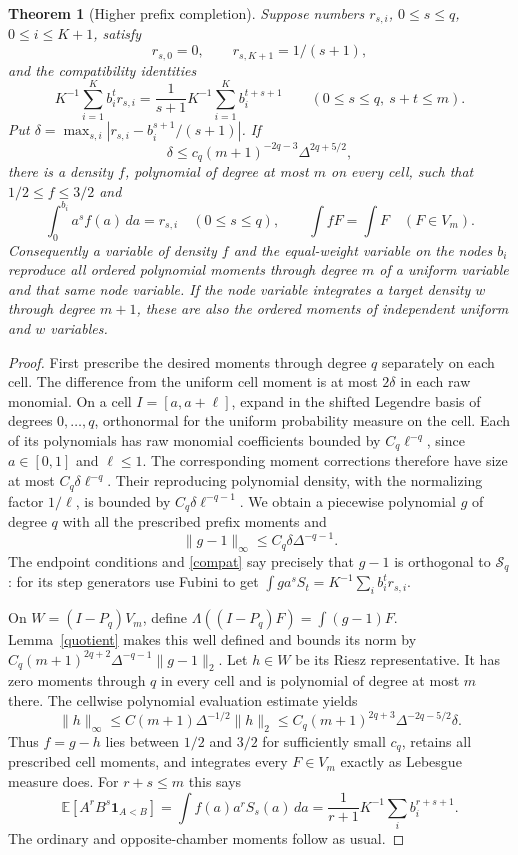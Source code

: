 \documentclass[11pt]{article}
\newtheorem{theorem}{Theorem}
\begin{document}
\begin{theorem}[Higher prefix completion]\label{main}
Suppose numbers $r_{s,i}$, $0\le s\le q$, $0\le i\le K+1$, satisfy
\[
 r_{s,0}=0,\qquad r_{s,K+1}=1/(s+1),
\]
and the compatibility identities
\begin{equation}\label{compat}
 K^{-1}\sum_{i=1}^K b_i^t r_{s,i}
 =\frac1{s+1}K^{-1}\sum_{i=1}^K b_i^{t+s+1}
 \qquad(0\le s\le q,\ s+t\le m).
\end{equation}
Put
$\delta=\max_{s,i}|r_{s,i}-b_i^{s+1}/(s+1)|$.
If
\[
 \delta\le c_q(m+1)^{-2q-3}\Delta^{2q+5/2},
\]
there is a density $f$, polynomial of degree at most $m$ on every cell,
such that $1/2\le f\le3/2$ and
\[
 \int_0^{b_i}a^s f(a)\,da=r_{s,i}\quad(0\le s\le q),
 \qquad \int fF=\int F\quad(F\in V_m).
\]
Consequently a variable of density $f$ and the equal-weight variable
on the nodes $b_i$ reproduce all ordered polynomial moments through
degree $m$ of a uniform variable and that same node variable.
If the node variable integrates a target density $w$ through degree
$m+1$, these are also the ordered moments of independent uniform and
$w$ variables.
\end{theorem}
\begin{proof}
First prescribe the desired moments through degree $q$ separately
on each cell. The difference from the uniform cell moment is at most
$2\delta$ in each raw monomial. On a cell $I=[a,a+\ell]$, expand in
the shifted Legendre basis of degrees $0,\ldots,q$, orthonormal for
the uniform probability measure on the cell.
Each of its polynomials has raw monomial coefficients bounded by
$C_q\ell^{-q}$, since $a\in[0,1]$ and $\ell\le1$.
The corresponding moment corrections therefore have size at most
$C_q\delta\ell^{-q}$. Their reproducing polynomial density, with the
normalizing factor $1/\ell$, is bounded by
$C_q\delta\ell^{-q-1}$. We obtain a piecewise polynomial $g$ of degree
$q$ with all the prescribed prefix moments and
\[
 \|g-1\|_\infty\le C_q\delta\Delta^{-q-1}.
\]
The endpoint conditions and \eqref{compat} say precisely that
$g-1$ is orthogonal to $\mathcal S_q$: for its step generators use
Fubini to get
$\int g a^sS_t=K^{-1}\sum_i b_i^t r_{s,i}$.

On $W=(I-P_q)V_m$, define
$\Lambda((I-P_q)F)=\int(g-1)F$.
Lemma~\ref{quotient} makes this well defined and bounds its norm by
$C_q(m+1)^{2q+2}\Delta^{-q-1}\|g-1\|_2$.
Let $h\in W$ be its Riesz representative. It has zero moments through
$q$ in every cell and is polynomial of degree at most $m$ there.
The cellwise polynomial evaluation estimate yields
\[
 \|h\|_\infty\le C(m+1)\Delta^{-1/2}\|h\|_2
 \le C_q(m+1)^{2q+3}\Delta^{-2q-5/2}\delta.
\]
Thus $f=g-h$ lies between $1/2$ and $3/2$ for sufficiently small $c_q$,
retains all prescribed cell moments, and integrates every $F\in V_m$
exactly as Lebesgue measure does.
For $r+s\le m$ this says
\[
 \mathbb E[A^rB^s\mathbf1_{A<B}]
 =\int f(a)a^rS_s(a)\,da
 =\frac1{r+1}K^{-1}\sum_i b_i^{r+s+1}.
\]
The ordinary and opposite-chamber moments follow as usual.
\end{proof}
\end{document}
